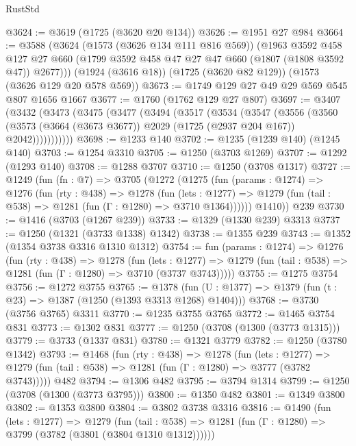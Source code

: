\begin{lexlean}{RustStd}
\begin{coremodule}
{\begin{coremodule}
{{{{{{{{{{{{{@3624 := @3619 (@1725 (@3620 @20 @134))
@3626 := @1951 @27 @984
@3664 := @3588
    (@3624
      (@1573 (@3626 @134 @111 @816 @569))
      (@1963
        @3592
        @458
        @127
        @27
        @660
        (@1799 @3592 @458 @47 @27 @47 @660 (@1807 (@1808 @3592 @47)) @2677)))
    (@1924 (@3616 @18))
    (@1725 (@3620 @82 @129))
    (@1573 (@3626 @129 @20 @578 @569))
@3673 := @1749 @129 @27 @49 @29 @569 @545 @807 @1656 @1667
@3677 := @1760 (@1762 @129 @27 @807)
@3697 := @3407
    (@3432
      (@3473
        (@3475
          (@3477
            (@3494
              (@3517
                (@3534
                  (@3547
                    (@3556
                      (@3560
                        (@3573
                          (@3664 (@3673 @3677))
                          @2029
                          (@1725 (@2937 @204 @167))
                          @2042)))))))))))
@3698 := @1233 @140
@3702 := @1235 (@1239 @140) (@1245 @140)
@3703 := @1254 @3310
@3705 := @1250 (@3703 @1269)
@3707 := @1292 (@1293 @140)
@3708 := @1288 @3707
@3710 := @1250 (@3708 @1317)
@3727 := @1249
    (fun (fn : @7) =>
    @3705
      (@1272
        (@1275
          (fun (params : @1274) =>
          @1276
            (fun (rty : @438) =>
            @1278
              (fun (lets : @1277) =>
              @1279 (fun (tail : @538) => @1281 (fun (Γ : @1280) => @3710 @1364))))))
        @1410))
    @239
@3730 := @1416 (@3703 (@1267 @239))
@3733 := @1329 (@1330 @239) @3313
@3737 := @1250 (@1321 (@3733 @1338) @1342)
@3738 := @1355 @239
@3743 := @1352 (@1354 @3738 @3316 @1310 @1312)
@3754 := fun (params : @1274) =>
  @1276
    (fun (rty : @438) =>
    @1278
      (fun (lets : @1277) =>
      @1279 (fun (tail : @538) => @1281 (fun (Γ : @1280) => @3710 (@3737 @3743)))))
@3755 := @1275 @3754
@3756 := @1272 @3755
@3765 := @1378 (fun (U : @1377) => @1379 (fun (t : @23) => @1387 (@1250 (@1393 @3313 @1268) @1404)))
@3768 := @3730 (@3756 @3765) @3311
@3770 := @1235 @3755 @3765
@3772 := @1465 @3754 @831
@3773 := @1302 @831
@3777 := @1250 (@3708 (@1300 (@3773 @1315)))
@3779 := @3733 (@1337 @831)
@3780 := @1321 @3779
@3782 := @1250 (@3780 @1342)
@3793 := @1468
    (fun (rty : @438) =>
    @1278
      (fun (lets : @1277) =>
      @1279 (fun (tail : @538) => @1281 (fun (Γ : @1280) => @3777 (@3782 @3743)))))
    @482
@3794 := @1306 @482
@3795 := @3794 @1314
@3799 := @1250 (@3708 (@1300 (@3773 @3795)))
@3800 := @1350 @482
@3801 := @1349 @3800
@3802 := @1353 @3800
@3804 := @3802 @3738 @3316
@3816 := @1490
    (fun (lets : @1277) =>
    @1279
      (fun (tail : @538) => @1281 (fun (Γ : @1280) => @3799 (@3782 (@3801 (@3804 @1310 @1312))))))
}}}}}}}}}}}}}
\end{coremodule}}
\end{coremodule}
\end{lexlean}
